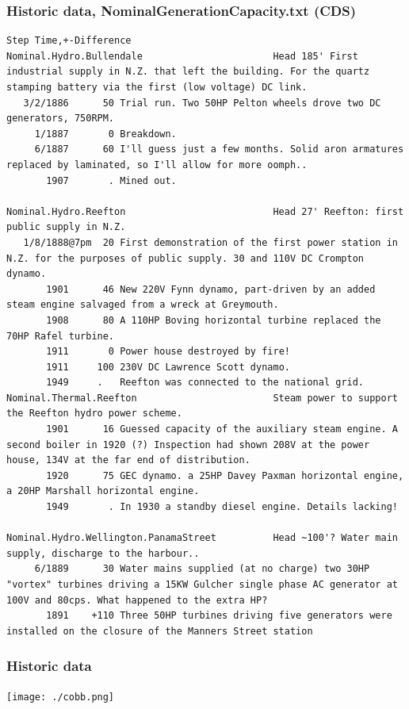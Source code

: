\documentclass[aspectratio=169]{beamer}
\begin{document}
\begin{frame}[fragile]
  \frametitle{Historic data, NominalGenerationCapacity.txt (CDS)}
  \scriptsize
  \begin{verbatim}
Step Time,+-Difference
Nominal.Hydro.Bullendale                       Head 185' First industrial supply in N.Z. that left the building. For the quartz stamping battery via the first (low voltage) DC link.
   3/2/1886      50 Trial run. Two 50HP Pelton wheels drove two DC generators, 750RPM.
     1/1887       0 Breakdown.
     6/1887      60 I'll guess just a few months. Solid aron armatures replaced by laminated, so I'll allow for more oomph..
       1907       . Mined out.

Nominal.Hydro.Reefton                          Head 27' Reefton: first public supply in N.Z.
   1/8/1888@7pm  20 First demonstration of the first power station in N.Z. for the purposes of public supply. 30 and 110V DC Crompton dynamo.
       1901      46 New 220V Fynn dynamo, part-driven by an added steam engine salvaged from a wreck at Greymouth.
       1908      80 A 110HP Boving horizontal turbine replaced the 70HP Rafel turbine.
       1911       0 Power house destroyed by fire!
       1911     100 230V DC Lawrence Scott dynamo.
       1949     .   Reefton was connected to the national grid.
Nominal.Thermal.Reefton                        Steam power to support the Reefton hydro power scheme.
       1901      16 Guessed capacity of the auxiliary steam engine. A second boiler in 1920 (?) Inspection had shown 208V at the power house, 134V at the far end of distribution.
       1920      75 GEC dynamo. a 25HP Davey Paxman horizontal engine, a 20HP Marshall horizontal engine.
       1949       . In 1930 a standby diesel engine. Details lacking!

Nominal.Hydro.Wellington.PanamaStreet          Head ~100'? Water main supply, discharge to the harbour..
     6/1889      30 Water mains supplied (at no charge) two 30HP "vortex" turbines driving a 15KW Gulcher single phase AC generator at 100V and 80cps. What happened to the extra HP?
       1891    +110 Three 50HP turbines driving five generators were installed on the closure of the Manners Street station

  \end{verbatim}
\end{frame}


\frame
{\frametitle{Historic data}
\begin{center}
\texttt{[image: ./cobb.png]} 
\end{center}
}
\end{document}
